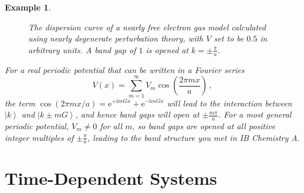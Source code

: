\documentclass{article}
\theoremstyle{plain}\theoremheaderfont{\normalfont\itshape}\theorembodyfont{\rmfamily}\theoremseparator{.}\newtheorem*{rem}{Remark}\newtheorem*{ex}{Example}\newtheorem*{proof}{Proof}\newtheorem*{altp}{Alternative proof}
\theoremstyle{plain}\theoremheaderfont{\normalfont\bfseries}\theorembodyfont{\rmfamily}\theoremseparator{.}\newtheorem{thm}{Theorem}[section]\newtheorem{lem}[thm]{Lemma}\newtheorem{prop}[thm]{Proposition}\newtheorem*{cor}{Corollary}\newtheorem{defn}[thm]{Definition}\newtheorem{clm}[thm]{Claim}\newtheorem{clminproof}{Claim}
\theoremstyle{break}\theoremheaderfont{\normalfont\itshape}\theorembodyfont{\rmfamily}\theoremseparator{.\medskip}\newtheorem*{proofskip}{Proof}\newtheorem*{exs}{Examples}\newtheorem*{rems}{Remarks}
\theoremstyle{break}\theoremheaderfont{\normalfont\bfseries}\theorembodyfont{\rmfamily}\theoremseparator{.\medskip}\newtheorem{lemskip}[thm]{Lemma}\newtheorem{defnskip}[thm]{Definition}\newtheorem{propskip}[thm]{Proposition}\newtheorem{thmskip}[thm]{Theorem}
\numberwithin{equation}{section}
\newcommand{\ii}{\mathrm{i}}
\newcommand{\ee}{\mathrm{e}}
\newcommand{\ket}[1]{\left| #1 \right\rangle}
\begin{document}
\begin{ex}
        \begin{figure}
            \centering
            
            \caption{The dispersion curve of a nearly free electron gas model calculated using nearly degenerate perturbation theory, with \(V\) set to be \(0.5\) in arbitrary units. A band gap of \(1\) is opened at \(k=\pm\frac{\pi}{a}\).}
        \end{figure}

        For a real periodic potential that can be written in a Fourier series
        \begin{equation}
            V(x)=\sum_{m=1}^{\infty}V_m\cos\left(\frac{2\pi mx}{a}\right)\,,
        \end{equation}
        the term \(\cos(2\pi mx/a)=\ee^{+\ii mGx}+\ee^{-\ii mGx}\) will lead to the interaction between \(\ket{k}\) and \(\ket{k\pm m G}\), and hence band gaps will open at \(\pm\frac{m\pi}{a}\). For a most general periodic potential, \(V_m\ne 0\) for all \(m\), so band gaps are opened at all positive integer multiples of \(\pm\frac{\pi}{a}\), leading to the band structure you met in IB Chemistry A.
    \end{ex}

    \newpage

    \section{Time-Dependent Systems}\label{Chap:TDPT}
\end{document}
